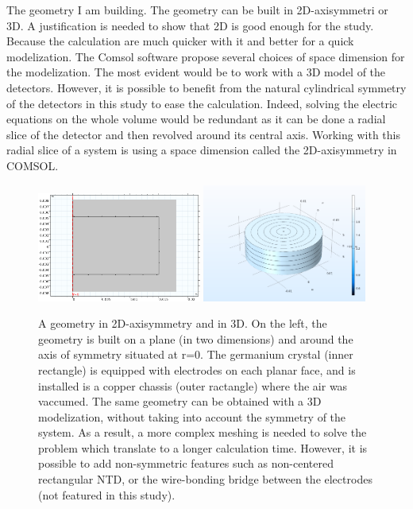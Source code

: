 The geometry I am building. The geometry can be built in 2D-axisymmetri or 3D. A justification is needed to show that 2D is good enough for the study. Because the calculation are much quicker with it and better for a quick modelization.
The Comsol software propose several choices of space dimension for the modelization. The most evident would be to work with a 3D model of the detectors. However, it is possible to benefit from the natural cylindrical symmetry of the detectors in this study to ease the calculation. Indeed, solving the electric equations on the whole volume would be redundant as it can be done a radial slice of the detector and then revolved around its central axis. Working with this radial slice of a system is using a space dimension called the 2D-axisymmetry in COMSOL.

\begin{figure}
\centering
\includegraphics[width=0.48\textwidth]{Figures/Electrodes/geometry_2d.png}
\includegraphics[width=0.48\textwidth]{Figures/Electrodes/detector_3d.png}
\caption{
A geometry in 2D-axisymmetry and in 3D. On the left, the geometry is built on a plane (in two dimensions) and around the axis of symmetry situated at r=0. The germanium crystal (inner rectangle) is equipped with electrodes on each planar face, and is installed is a copper chassis (outer ractangle) where the air was vaccumed.
The same geometry can be obtained with a 3D modelization, without taking into account the symmetry of the system. As a result, a more complex meshing is needed to solve the problem which translate to a longer calculation time. However, it is possible to add non-symmetric features such as non-centered rectangular NTD, or the wire-bonding bridge between the electrodes (not featured in this study). 
}
\label{fig:space-dimension-geometry}
\end{figure}

